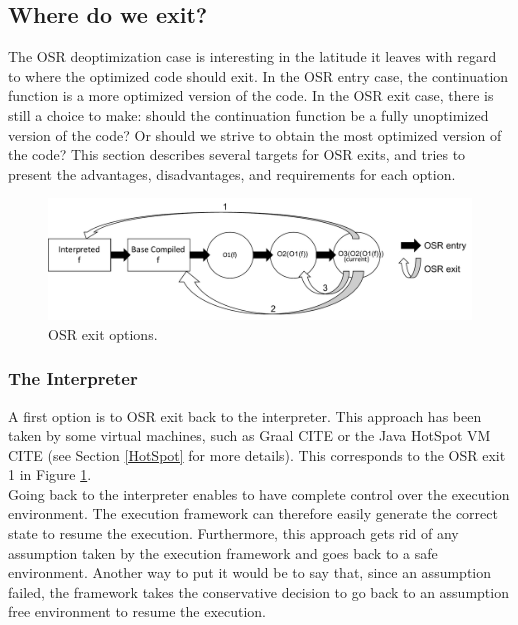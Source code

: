 \subsection{Where do we exit?}
The OSR deoptimization case is interesting in the latitude it leaves with regard to where the optimized code should exit.
In the OSR entry case, the continuation function is a more optimized version of the code.
In the OSR exit case, there is still a choice to make: should the continuation function be a fully unoptimized version of the code? Or should we strive to obtain the most optimized version of the code?
This section describes several targets for OSR exits, and tries to present the advantages, disadvantages, and requirements for each option.\\

\begin{figure}[h]
\centering
\includegraphics[scale=0.5]{Figures/wheretoexit}
\decoRule
\caption[OSR exit options]{OSR exit options.}
\label{OSR exit options}
\end{figure}

\subsubsection{The Interpreter}
A first option is to OSR exit back to the interpreter. 
This approach has been taken by some virtual machines, such as Graal CITE or the Java HotSpot VM CITE (see Section \ref{HotSpot} for more details).
This corresponds to the OSR exit 1 in Figure \ref{OSR exit options}.\\

Going back to the interpreter enables to have complete control over the execution environment.
The execution framework can therefore easily generate the correct state to resume the execution.
Furthermore, this approach gets rid of any assumption taken by the execution framework and goes back to a safe environment.
Another way to put it would be to say that, since an assumption failed, the framework takes the conservative decision to go back to an assumption free environment to resume the execution.\\

